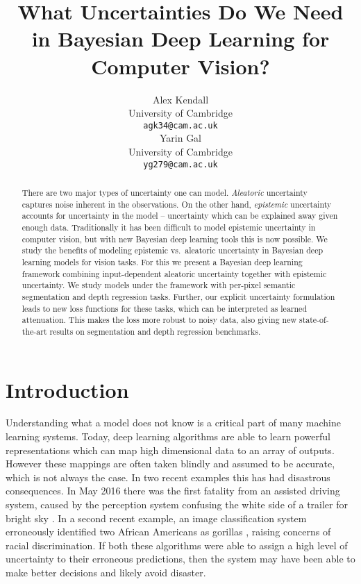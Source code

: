 \documentclass{article}
\title{What Uncertainties Do We Need in Bayesian Deep Learning for Computer Vision?}
\author{
  Alex Kendall\\
  University of Cambridge\\
  \texttt{agk34@cam.ac.uk}\\
  \And
  Yarin Gal\\
  University of Cambridge\\
  \texttt{yg279@cam.ac.uk}\\
}
\begin{document}
\maketitle

\begin{abstract}
There are two major types of uncertainty one can model. \textit{Aleatoric} uncertainty captures noise inherent in the observations. On the other hand, \textit{epistemic} uncertainty accounts for uncertainty in the model -- uncertainty which can be explained away given enough data. Traditionally it has been difficult to model epistemic uncertainty in computer vision, but with new Bayesian deep learning tools this is now possible.
We study the benefits of modeling epistemic vs.\ aleatoric uncertainty in Bayesian deep learning models for vision tasks. For this we present a Bayesian deep learning framework combining input-dependent aleatoric uncertainty together with epistemic uncertainty. We study models under the framework with per-pixel semantic segmentation and depth regression tasks. Further, our explicit uncertainty formulation leads to new loss functions for these tasks, which can be interpreted as learned attenuation. This makes the loss more robust to noisy data, also giving new state-of-the-art results on segmentation and depth regression benchmarks. 
\end{abstract} 


\section{Introduction}
\label{introduction}

Understanding what a model does not know is a critical part of many machine learning systems. Today, deep learning algorithms are able to learn powerful representations which can map high dimensional data to an array of outputs. However these mappings are often taken blindly and assumed to be accurate, which is not always the case. In two recent examples this has had disastrous consequences. In May 2016 there was the first fatality from an assisted driving system, caused by the perception system confusing the white side of a trailer for bright sky \cite{teslaCrashReport}. In a second recent example, an image classification system erroneously identified two African Americans as gorillas \cite{googleblackgorilla}, raising concerns of racial discrimination. If both these algorithms were able to assign a high level of uncertainty to their erroneous predictions, then the system may have been able to make better decisions and likely avoid disaster.
\end{document}
